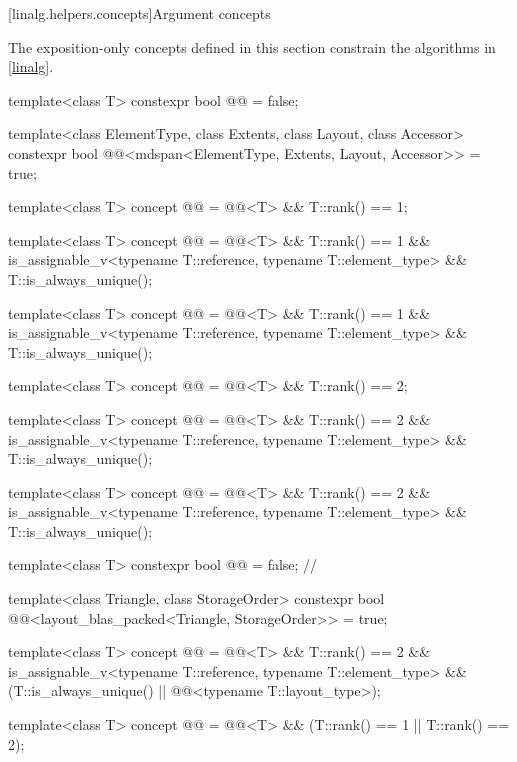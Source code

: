 [linalg.helpers.concepts]{Argument concepts}

\pnum
The exposition-only concepts defined in this section
constrain the algorithms in \ref{linalg}.
\begin{codeblock}
template<class T>
  constexpr bool @@ = false;

template<class ElementType, class Extents, class Layout, class Accessor>
  constexpr bool @@<mdspan<ElementType, Extents, Layout, Accessor>> = true;

template<class T>
  concept @@ =
    @@<T> && T::rank() == 1;

template<class T>
  concept @@ =
    @@<T> && T::rank() == 1 &&
    is_assignable_v<typename T::reference, typename T::element_type> && T::is_always_unique();

template<class T>
  concept @@ =
    @@<T> && T::rank() == 1 &&
    is_assignable_v<typename T::reference, typename T::element_type> && T::is_always_unique();

template<class T>
  concept @@ =
    @@<T> && T::rank() == 2;

template<class T>
  concept @@ =
    @@<T> && T::rank() == 2 &&
    is_assignable_v<typename T::reference, typename T::element_type> && T::is_always_unique();

template<class T>
  concept @@ =
    @@<T> && T::rank() == 2 &&
    is_assignable_v<typename T::reference, typename T::element_type> && T::is_always_unique();

template<class T>
  constexpr bool @@ = false;    // \expos

template<class Triangle, class StorageOrder>
  constexpr bool @@<layout_blas_packed<Triangle, StorageOrder>> = true;

template<class T>
  concept @@ =
    @@<T> && T::rank() == 2 &&
    is_assignable_v<typename T::reference, typename T::element_type> &&
    (T::is_always_unique() || @@<typename T::layout_type>);

template<class T>
  concept @@ =
    @@<T> && (T::rank() == 1 || T::rank() == 2);


\end{codeblock}
